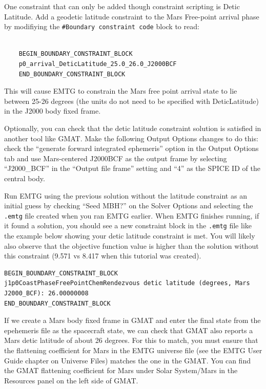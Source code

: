 \documentclass[11pt]{article}
\begin{document}
\noindent One constraint that can only be added though constraint scripting is Detic Latitude. Add a geodetic latitude constraint to the Mars Free-point arrival phase by modifiying the \verb|#Boundary constraint code| block to read:   


\begin{verbatim}

    BEGIN_BOUNDARY_CONSTRAINT_BLOCK
    p0_arrival_DeticLatitude_25.0_26.0_J2000BCF
    END_BOUNDARY_CONSTRAINT_BLOCK

\end{verbatim}

\noindent This will cause \ac{EMTG} to constrain the Mars free point arrival state to lie between 25-26 degrees (the units do not need to be specified with DeticLatitude) in the J2000 body fixed frame.

\noindent Optionally, you can check that the detic latitude constraint solution is satisfied in another tool like \ac{GMAT}. Make the following Output Options changes to do this: check the ``generate forward integrated ephemeris'' option in the Output Options tab and use Mars-centered J2000BCF as the output frame by selecting ``J2000\_BCF'' in the ``Output file frame'' setting and ``4'' as the \acs{SPICE} ID of the central body. 

\noindent Run \ac{EMTG} using the previous solution without the latitude constraint as an initial guess by checking ``Seed \acs{MBH}?'' on the Solver Options and selecting the \verb|.emtg| file created when you ran \ac{EMTG} earlier. When \ac{EMTG} finishes running, if it found a solution, you should see a new constraint block in the \verb|.emtg| file like the example below showing your detic latitude constraint is met. You will likely also observe that the objective function value is higher than the solution without this constraint (9.571 vs 8.417 when this tutorial was created).

\begin{verbatim}
BEGIN_BOUNDARY_CONSTRAINT_BLOCK
j1p0CoastPhaseFreePointChemRendezvous detic latitude (degrees, Mars J2000_BCF): 26.00000008
END_BOUNDARY_CONSTRAINT_BLOCK
\end{verbatim}

\noindent If we create a Mars body fixed frame in \ac{GMAT} and enter the final state from the epehemeris file as the spacecraft state, we can check that \ac{GMAT} also reports a Mars detic latitude of about 26 degrees. For this to match, you must ensure that the flattening coefficient for Mars in the \ac{EMTG} universe file (see the \ac{EMTG} User Guide chapter on Universe Files) matches the one in the \ac{GMAT}. You can find the \ac{GMAT} flattening coefficient for Mars under Solar System/Mars in the Resources panel on the left side of \ac{GMAT}. 
\end{document}
